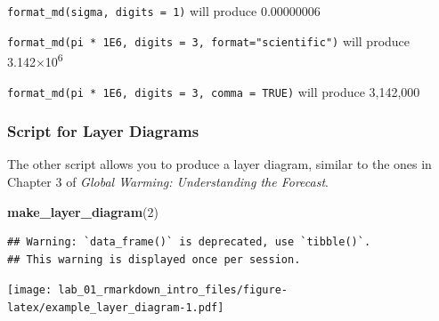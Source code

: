 \documentclass[
]{article}
\newenvironment{Shaded}{\begin{snugshade}}{\end{snugshade}}
\newcommand{\DecValTok}[1]{\textcolor[rgb]{0.00,0.00,0.81}{#1}}
\newcommand{\KeywordTok}[1]{\textcolor[rgb]{0.13,0.29,0.53}{\textbf{#1}}}
\newcommand{\NormalTok}[1]{#1}
\begin{document}
\texttt{format\_md(sigma,\ digits\ =\ 1)} will produce 0.00000006

\texttt{format\_md(pi\ *\ 1E6,\ digits\ =\ 3,\ format="scientific")}
will produce 3.142×10\textsuperscript{6}

\texttt{format\_md(pi\ *\ 1E6,\ digits\ =\ 3,\ comma\ =\ TRUE)} will
produce 3,142,000

\hypertarget{script-for-layer-diagrams}{%
\subsubsection{Script for Layer
Diagrams}\label{script-for-layer-diagrams}}

The other script allows you to produce a layer diagram, similar to the
ones in Chapter 3 of \emph{Global Warming: Understanding the Forecast}.

\begin{Shaded}
\begin{Highlighting}[]
\KeywordTok{make_layer_diagram}\NormalTok{(}\DecValTok{2}\NormalTok{)}
\end{Highlighting}
\end{Shaded}

\begin{verbatim}
## Warning: `data_frame()` is deprecated, use `tibble()`.
## This warning is displayed once per session.
\end{verbatim}

\texttt{[image: lab\_01\_rmarkdown\_intro\_files/figure-latex/example\_layer\_diagram-1.pdf]}
\end{document}
